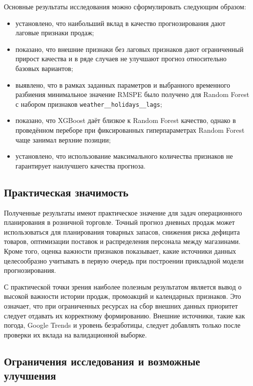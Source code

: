 \documentclass[12pt,a4paper]{article}
\numberwithin{equation}{section}
\begin{document}
Основные результаты исследования можно сформулировать следующим образом:
\begin{itemize}
    \item установлено, что наибольший вклад в качество прогнозирования дают лаговые признаки продаж;
    \item показано, что внешние признаки без лаговых признаков дают ограниченный прирост качества и в ряде случаев не улучшают прогноз относительно базовых вариантов;
    \item выявлено, что в рамках заданных параметров и выбранного временного разбиения минимальное значение RMSPE было получено для Random Forest с набором признаков \texttt{weather\_\_holidays\_\_lags};
    \item показано, что XGBoost даёт близкое к Random Forest качество, однако в проведённом переборе при фиксированных гиперпараметрах Random Forest чаще занимал верхние позиции;
    \item установлено, что использование максимального количества признаков не гарантирует наилучшего качества прогноза.

\end{itemize}
\subsection{Практическая значимость}

Полученные результаты имеют практическое значение для задач операционного планирования в розничной торговле. Точный прогноз дневных продаж может использоваться для планирования товарных запасов, снижения риска дефицита товаров, оптимизации поставок и распределения персонала между магазинами. Кроме того, оценка важности признаков показывает, какие источники данных целесообразно учитывать в первую очередь при построении прикладной модели прогнозирования.

С практической точки зрения наиболее полезным результатом является вывод о высокой важности истории продаж, промоакций и календарных признаков. Это означает, что при ограниченных ресурсах на сбор внешних данных приоритет следует отдавать их корректному формированию. Внешние источники, такие как погода, Google Trends и уровень безработицы, следует добавлять только после проверки их вклада на валидационной выборке.

\subsection{Ограничения исследования и возможные улучшения}
\end{document}
